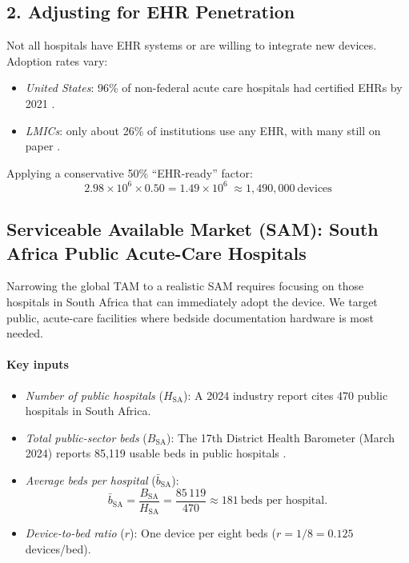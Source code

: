 \documentclass[a4paper,11pt]{article}
\begin{document}
\subsection*{2. Adjusting for EHR Penetration}

Not all hospitals have EHR systems or are willing to integrate new devices. Adoption rates vary:

\begin{itemize}
  \item \emph{United States}: 96\% of non-federal acute care hospitals had certified EHRs by 2021 \cite{DiscoverMostCommon,desrochesElectronicHealthRecords2008}.
  \item \emph{LMICs}: only about 26\% of institutions use any EHR, with many still on paper \cite{ProgressImplementingUsing2023}.
\end{itemize}

Applying a conservative 50\% “EHR-ready” factor:
\[
  2.98\times10^{6} \times 0.50
  = 1.49\times10^{6}
  \;\approx1{,}490{,}000\ \text{devices}
\]

\subsection{Serviceable Available Market (SAM): South Africa Public Acute-Care Hospitals}

Narrowing the global TAM to a realistic SAM requires focusing on those hospitals in South Africa that can immediately adopt the device.  We target public, acute-care facilities where bedside documentation hardware is most needed.

\paragraph{Key inputs}  
\begin{itemize}
  \item \emph{Number of public hospitals} (\(H_{\mathrm{SA}}\)):  
    A 2024 industry report cites 470 public hospitals in South Africa. \cite{BridgingGapSouth}
    
  \item \emph{Total public-sector beds} (\(B_{\mathrm{SA}}\)):  
    The 17th District Health Barometer (March 2024) reports 85,119 usable beds in public hospitals \cite{PDFDistrictHealth2025}.  
    
  \item \emph{Average beds per hospital} (\(\bar b_{\mathrm{SA}}\)):  
    \[
      \bar b_{\mathrm{SA}}
      = \frac{B_{\mathrm{SA}}}{H_{\mathrm{SA}}}
      = \frac{85\,119}{470}
      \approx 181\ \text{beds per hospital}.
    \]
  \item \emph{Device-to-bed ratio} (\(r\)):  
    One device per eight beds (\(r=1/8=0.125\) devices/bed).
\end{itemize}
\end{document}
